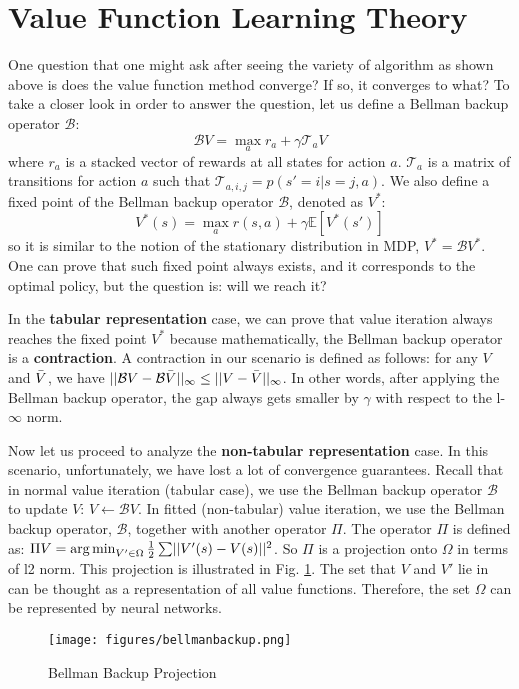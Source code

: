 \section{Value Function Learning Theory}
One question that one might ask after seeing the variety of algorithm as shown above is does the value function method converge? If so, it converges to what? To take a closer look in order to answer the question, let us define a Bellman backup operator $\mathcal{B}$:
$$\mathcal{B}V = \max_a r_a + \gamma\mathcal{T}_aV$$
where $r_a$ is a stacked vector of rewards at all states for action $a$. $\mathcal{T}_a$ is a matrix of transitions for action $a$ such that $\mathcal{T}_{a,i,j} = p(s'=i|s=j, a)$.
We also define a fixed point of the Bellman backup operator $\mathcal{B}$, denoted as $V^*$:
$$V^*(s) = \max_a r(s,a) + \gamma\mathbb{E}[V^*(s')]$$
so it is similar to the notion of the stationary distribution in MDP, $V^* = \mathcal{B}V^*$. One can prove that such fixed point always exists, and it corresponds to the optimal policy, but the question is: will we reach it?

In the \textbf{tabular representation} case, we can prove that value iteration always reaches the fixed point $V^*$ because mathematically, the Bellman backup operator is a \textbf{contraction}. A contraction in our scenario is defined as follows: for any $V$ and $\Bar{V}$, we have $\lvert|\mathcal{B}V - \mathcal{B}\Bar{V}|\rvert_\infty \leq \lvert|V -\Bar{V}|\rvert_\infty$. In other words, after applying the Bellman backup operator, the gap always gets smaller by $\gamma$ with respect to the l-$\infty$ norm.

Now let us proceed to analyze the \textbf{non-tabular representation} case. In this scenario, unfortunately, we have lost a lot of convergence guarantees. Recall that in normal value iteration (tabular case), we use the Bellman backup operator $\mathcal{B}$ to update $V$: $V\leftarrow \mathcal{B}V$. In fitted (non-tabular) value iteration, we use the Bellman backup operator, $\mathcal{B}$, together with another operator $\Pi$. The operator $\Pi$ is defined as:
$\Pi V = \operatorname*{arg\,min}_{V'\in\Omega}\frac{1}{2}\sum\lvert|V'(s) - V(s)|\rvert^2$. So $\Pi$ is a projection onto $\Omega$ in terms of l2 norm. This projection is illustrated in Fig. \ref{fig:bellmanbackup}. The set that $V$ and $V'$ lie in can be thought as a representation of all value functions. Therefore, the set $\Omega$ can be represented by neural networks.

\begin{figure}
    \centering
    \texttt{[image: figures/bellmanbackup.png]}
    \caption{Bellman Backup Projection}
    \label{fig:bellmanbackup}
\end{figure}

